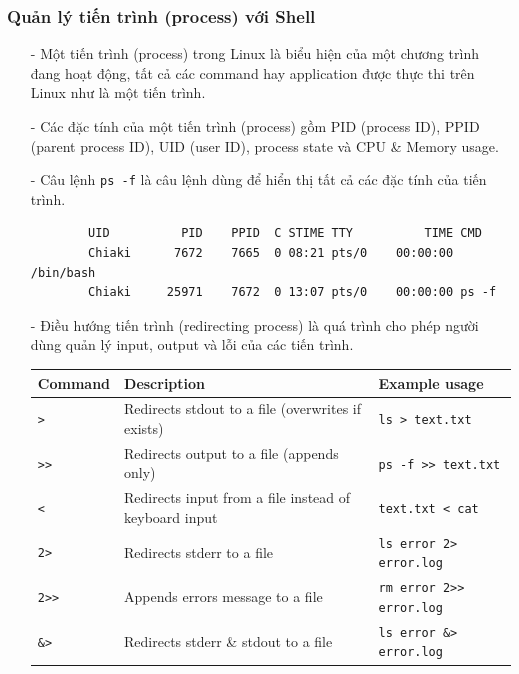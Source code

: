 \documentclass{article}
\begin{document}
    \subsubsection{Quản lý tiến trình (process) với Shell}
    \begin{itemize}
        \item[-] Một tiến trình (process) trong Linux là biểu hiện của một chương trình đang hoạt động, tất cả các command hay application được thực thi trên Linux như là một tiến trình.
        \item[-] Các đặc tính của một tiến trình (process) gồm PID (process ID), PPID (parent process ID), UID (user ID), process state và CPU \& Memory usage. 
        \item[-] Câu lệnh \verb|ps -f| là câu lệnh dùng để hiển thị tất cả các đặc tính của tiến trình.
        \begin{verbatim}
        UID          PID    PPID  C STIME TTY          TIME CMD   
        Chiaki      7672    7665  0 08:21 pts/0    00:00:00 /bin/bash
        Chiaki     25971    7672  0 13:07 pts/0    00:00:00 ps -f
        \end{verbatim} 
        \item[-] Điều hướng tiến trình (redirecting process) là quá trình cho phép người dùng quản lý input, output và lỗi của các tiến trình.\\
        \begin{center}
        \begin{tabular}{ | l | l | l | }
            \hline
            Command & Description & Example usage \\ \hline            
            \verb|>| & Redirects stdout to a file (overwrites if exists) & \verb|ls > text.txt| \\ \hline      
            \verb|>>| & Redirects output to a file (appends only) & \verb|ps -f >> text.txt| \\ \hline      
            \verb|<| & Redirects input from a file instead of keyboard input & \verb|text.txt < cat| \\ \hline
            \verb|2>| & Redirects stderr to a file & \verb|ls error 2> error.log| \\ \hline
            \verb|2>>| & Appends errors message to a file & \verb|rm error 2>> error.log| \\ \hline
            \verb|&>| & Redirects stderr \& stdout to a file & \verb|ls error &> error.log| \\ \hline
          \end{tabular}
          \end{center}
    \end{itemize}
\end{document}
